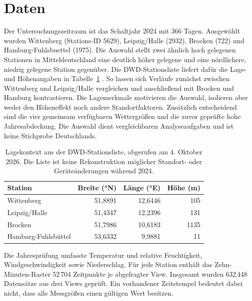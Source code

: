 \documentclass[usegeometry=true]{scrartcl}
\begin{document}
\section{Daten}
Der Untersuchungszeitraum ist das Schaltjahr 2024 mit 366 Tagen.
Ausgewählt wurden Wittenberg (Stations-ID 5629), Leipzig/Halle (2932),
Brocken (722) und Hamburg-Fuhlsbuettel (1975). Die Auswahl stellt zwei ähnlich hoch gelegenen Stationen in
Mitteldeutschland eine deutlich höher gelegene und eine nördlichere,
niedrig gelegene Station gegenüber. Die DWD-Stationsliste liefert dafür
die Lage- und Höhenangaben in Tabelle~\ref{tab:stations}
\autocite{dwd2026stations}. So lassen sich Verläufe zunächst zwischen
Wittenberg und Leipzig/Halle vergleichen und anschließend mit Brocken
und Hamburg kontrastieren. Die Lagemerkmale motivieren die Auswahl,
isolieren aber weder den Höheneffekt noch andere Standortfaktoren.
Zusätzlich entscheidend sind die vier gemeinsam verfügbaren Wettergrößen
und die zuvor geprüfte hohe Jahresabdeckung. Die Auswahl dient
vergleichbaren Analyseaufgaben und ist keine Stichprobe Deutschlands.
\begin{table}[htbp]
  \centering\small
  \begin{tabular}{lrrr}
    Station & Breite (°N) & Länge (°E) & Höhe (m) \\
    \hline
    Wittenberg & 51,8891 & 12,6446 & 105 \\
    Leipzig/Halle & 51,4347 & 12,2396 & 131 \\
    Brocken & 51,7986 & 10,6183 & 1135 \\
    Hamburg-Fuhlsbüttel & 53,6332 & 9,9881 & 11 \\
  \end{tabular}
  \caption{Lagekontext aus der DWD-Stationsliste, abgerufen am
  4. Oktober 2026. Die Liste ist keine Rekonstruktion möglicher
  Standort- oder Geräteänderungen während 2024.}
  \label{tab:stations}
\end{table}

Die Jahresprüfung umfasste
Temperatur und relative Feuchtigkeit, Windgeschwindigkeit sowie Niederschlag.
Für jede Station enthält das Zehn-Minuten-Raster 52\,704 Zeitpunkte je
abgefragter View. Insgesamt wurden 632\,448 Datensätze aus drei Views
geprüft. Ein vorhandener Zeitstempel bedeutet dabei nicht, dass alle
Messgrößen einen gültigen Wert besitzen.
\end{document}
